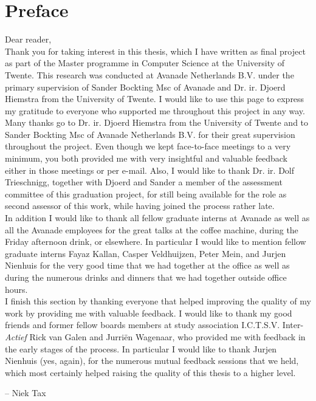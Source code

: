 
\bigskip

\begingroup
\let\clearpage\relax
\let\cleardoublepage\relax
\let\cleardoublepage\relax
\chapter*{Preface}
Dear reader,\\

Thank you for taking interest in this thesis, which I have written as final project as part of the Master programme in Computer Science at the University of Twente. This research was conducted at Avanade Netherlands B.V. under the primary supervision of Sander Bockting Msc of Avanade and Dr. ir. Djoerd Hiemstra from the University of Twente. I would like to use this page to express my gratitude to everyone who supported me throughout this project in any way.\\

Many thanks go to Dr. ir. Djoerd Hiemstra from the University of Twente and to Sander Bockting Msc of Avanade Netherlands B.V. for their great supervision throughout the project. Even though we kept face-to-face meetings to a very minimum, you both provided me with very insightful and valuable feedback either in those meetings or per e-mail. Also, I would like to thank Dr. ir. Dolf Trieschnigg, together with Djoerd and Sander a member of the assessment committee of this graduation project, for still being available for the role as second assessor of this work, while having joined the process rather late.\\

In addition I would like to thank all fellow graduate interns at Avanade as well as all the Avanade employees for the great talks at the coffee machine, during the Friday afternoon drink, or elsewhere. In particular I would like to mention fellow graduate interns Fayaz Kallan, Casper Veldhuijzen, Peter Mein, and Jurjen Nienhuis for the very good time that we had together at the office as well as during the numerous drinks and dinners that we had together outside office hours.\\

I finish this section by thanking everyone that helped improving the quality of my work by providing me with valuable feedback. I would like to thank my good friends and former fellow boards members at study association I.C.T.S.V. Inter-\emph{Actief} Rick van Galen and Jurri\"{e}n Wagenaar, who provided me with feedback in the early stages of the process. In particular I would like to thank Jurjen Nienhuis (yes, again), for the numerous mutual feedback sessions that we held, which most certainly helped raising the quality of this thesis to a higher level.\\
\bigskip

-- Niek Tax

\endgroup



